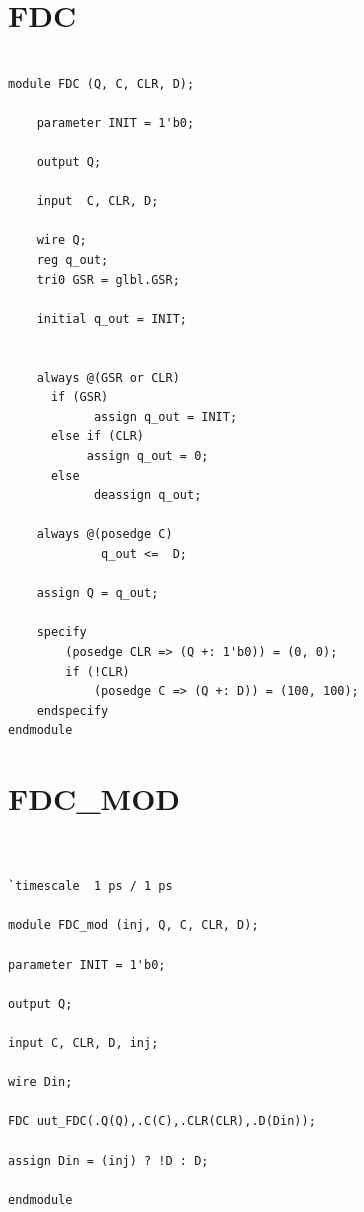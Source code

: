 \documentclass[a4paper,openright,12pt]{report}
\begin{document}
\section{FDC}
\begin{lstlisting}

module FDC (Q, C, CLR, D);

    parameter INIT = 1'b0;

    output Q;

    input  C, CLR, D;

    wire Q;
    reg q_out;
    tri0 GSR = glbl.GSR;

    initial q_out = INIT;


    always @(GSR or CLR)
      if (GSR)
            assign q_out = INIT;
      else if (CLR)
           assign q_out = 0;
      else
            deassign q_out;

    always @(posedge C)
	         q_out <=  D;

    assign Q = q_out;

    specify
        (posedge CLR => (Q +: 1'b0)) = (0, 0);
        if (!CLR)
            (posedge C => (Q +: D)) = (100, 100);
    endspecify
endmodule
\end{lstlisting}

\section{FDC\_MOD}
\begin{lstlisting}


`timescale  1 ps / 1 ps

module FDC_mod (inj, Q, C, CLR, D);

parameter INIT = 1'b0;

output Q;

input C, CLR, D, inj;

wire Din;

FDC uut_FDC(.Q(Q),.C(C),.CLR(CLR),.D(Din));

assign Din = (inj) ? !D : D;

endmodule

\end{lstlisting}
\end{document}
